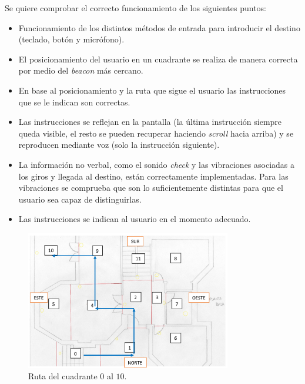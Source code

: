 Se quiere comprobar el correcto funcionamiento de los siguientes puntos:
\begin{itemize}
	
	\item Funcionamiento de los distintos métodos de entrada para introducir el destino (teclado, botón y micrófono).
	
	\item El posicionamiento del usuario en un cuadrante se realiza de manera correcta por medio del \textit{beacon} más cercano. 
	
	\item En base al posicionamiento y la ruta que sigue el usuario las instrucciones que se le indican son correctas. 
	
	\item Las instrucciones se reflejan en la pantalla (la última instrucción siempre queda visible, el resto se pueden recuperar haciendo \textit{scroll} hacia arriba) y se reproducen mediante voz (solo la instrucción siguiente).
	
	\item La información no verbal, como el sonido \textit{check} y las vibraciones asociadas a los giros y llegada al destino, están correctamente implementadas. Para las vibraciones se comprueba que son lo suficientemente distintas para que el usuario sea capaz de distinguirlas.
	
	\item Las instrucciones se indican al usuario en el momento adecuado. 
\end{itemize}

\begin{figure}[t]
	\centering
	\includegraphics[width=0.8\textwidth]{Imagenes/Evaluacion/del0al10}
	\caption{Ruta del cuadrante $0$ al $10$.}
	\label{fig:del0al10}
\end{figure}

